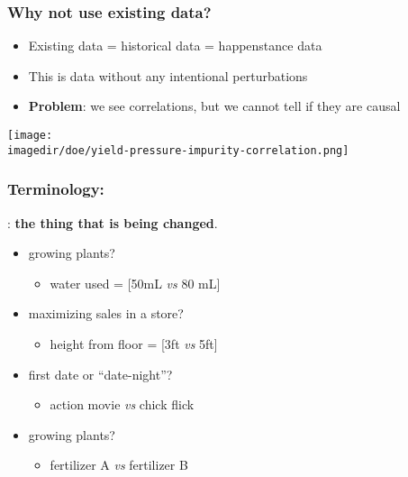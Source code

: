 \begin{frame}\frametitle{Why not use existing data?}
	\begin{itemize}
		\item	Existing data = historical data = happenstance data
		\item	This is data without any intentional perturbations
		\item	\textbf{Problem}: we see correlations, but we cannot tell if they are causal
	\end{itemize}
	\texttt{[image: \\imagedir/doe/yield-pressure-impurity-correlation.png]}
\end{frame}

\begin{frame}\frametitle{Terminology: {\color{purple}{Factors}}}
	{\color{purple}{Factor}}: \textbf{the thing that is being changed}.
	
	\vspace{12pt}
	\begin{itemize}
		\item	growing plants? 
			\begin{itemize}
				\item	water used = [50mL \emph{vs} 80 mL]
			\end{itemize}
		\item	maximizing sales in a store? 
			\begin{itemize}
				\item	height from floor = [3ft \emph{vs} 5ft]
			\end{itemize}
		\item	first date or ``date-night''?
			\begin{itemize}
				\item	action movie \emph{vs} chick flick
			\end{itemize}
		\item	growing plants?
			\begin{itemize}
				\item	fertilizer A \emph{vs} fertilizer B
			\end{itemize}
	\end{itemize}
\end{frame}

